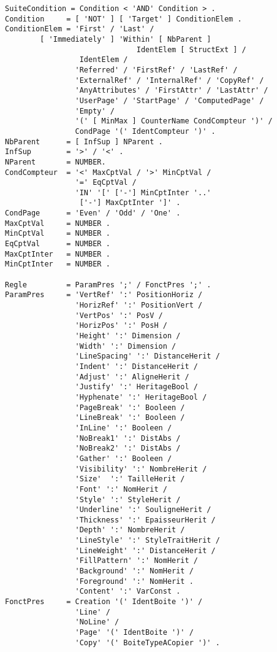{\begin{verbatim}
SuiteCondition = Condition < 'AND' Condition > .
Condition     = [ 'NOT' ] [ 'Target' ] ConditionElem .
ConditionElem = 'First' / 'Last' /
		[ 'Immediately' ] 'Within' [ NbParent ]
                              IdentElem [ StructExt ] /
                 IdentElem /
                'Referred' / 'FirstRef' / 'LastRef' /
                'ExternalRef' / 'InternalRef' / 'CopyRef' /
                'AnyAttributes' / 'FirstAttr' / 'LastAttr' /
                'UserPage' / 'StartPage' / 'ComputedPage' /
                'Empty' /
                '(' [ MinMax ] CounterName CondCompteur ')' /
                CondPage '(' IdentCompteur ')' .
NbParent      = [ InfSup ] NParent .
InfSup        = '>' / '<' .
NParent       = NUMBER.
CondCompteur  = '<' MaxCptVal / '>' MinCptVal /
                '=' EqCptVal / 
                'IN' '[' ['-'] MinCptInter '..' 
                 ['-'] MaxCptInter ']' .
CondPage      = 'Even' / 'Odd' / 'One' .
MaxCptVal     = NUMBER .
MinCptVal     = NUMBER .
EqCptVal      = NUMBER .
MaxCptInter   = NUMBER .
MinCptInter   = NUMBER .

Regle         = ParamPres ';' / FonctPres ';' .
ParamPres     = 'VertRef' ':' PositionHoriz /
                'HorizRef' ':' PositionVert /
                'VertPos' ':' PosV /
                'HorizPos' ':' PosH /
                'Height' ':' Dimension /
                'Width' ':' Dimension /
                'LineSpacing' ':' DistanceHerit /
                'Indent' ':' DistanceHerit /
                'Adjust' ':' AligneHerit /
                'Justify' ':' HeritageBool /
                'Hyphenate' ':' HeritageBool /
                'PageBreak' ':' Booleen /
                'LineBreak' ':' Booleen /
                'InLine' ':' Booleen /
                'NoBreak1' ':' DistAbs /
                'NoBreak2' ':' DistAbs /
                'Gather' ':' Booleen /
                'Visibility' ':' NombreHerit /
                'Size'  ':' TailleHerit /
                'Font' ':' NomHerit /
                'Style' ':' StyleHerit /
                'Underline' ':' SouligneHerit /
                'Thickness' ':' EpaisseurHerit /
                'Depth' ':' NombreHerit /
                'LineStyle' ':' StyleTraitHerit /
                'LineWeight' ':' DistanceHerit /
                'FillPattern' ':' NomHerit /
                'Background' ':' NomHerit /
                'Foreground' ':' NomHerit .
                'Content' ':' VarConst .
FonctPres     = Creation '(' IdentBoite ')' /
                'Line' /
                'NoLine' /
                'Page' '(' IdentBoite ')' /
                'Copy' '(' BoiteTypeACopier ')' .


\end{verbatim}}
